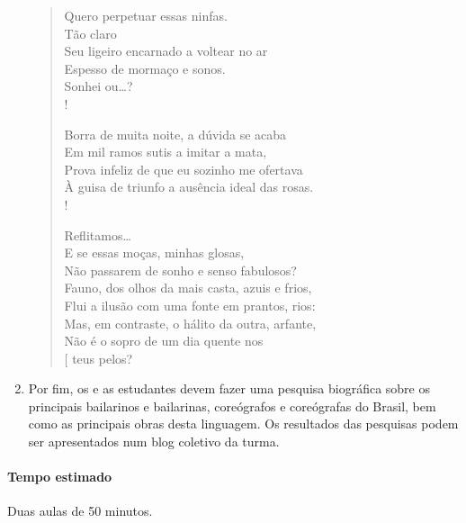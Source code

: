 \documentclass[12pt]{extarticle}
\begin{document}
\begin{enumerate}
\begin{verse}
Quero perpetuar essas ninfas.\\
                                    \hspace{5cm}             Tão claro\\
Seu ligeiro encarnado a voltear no ar\\
Espesso de mormaço e sonos.\\
                             \hspace{5cm}                    Sonhei ou…?\\!

Borra de muita noite, a dúvida se acaba\\
Em mil ramos sutis a imitar a mata,\\
Prova infeliz de que eu sozinho me ofertava\\
À guisa de triunfo a ausência ideal das rosas.\\!

Reflitamos…\\
        \hspace{2cm}         E se essas moças, minhas glosas,\\
Não passarem de sonho e senso fabulosos?\\
Fauno, dos olhos da mais casta, azuis e frios,\\
Flui a ilusão com uma fonte em prantos, rios:\\
Mas, em contraste, o hálito da outra, arfante,\\
Não é o sopro de um dia quente nos\\
\hfill $[$ teus pelos?
\end{verse}


  \item
  Por fim, os e as estudantes devem fazer uma pesquisa biográfica
  sobre os principais bailarinos e bailarinas, coreógrafos 
  e coreógrafas do Brasil, bem como as principais obras desta linguagem. 
  Os resultados das pesquisas podem ser apresentados num blog coletivo da
  turma.

\end{enumerate}

\paragraph{Tempo estimado} Duas aulas de 50 minutos.



\end{document}

